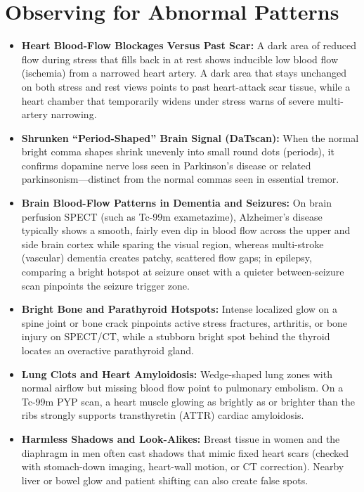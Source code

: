 \section{Observing for Abnormal Patterns}

\begin{itemize}
    \item \textbf{Heart Blood-Flow Blockages Versus Past Scar:} A dark area of reduced flow during stress that fills back in at rest shows inducible low blood flow (ischemia) from a narrowed heart artery. A dark area that stays unchanged on both stress and rest views points to past heart-attack scar tissue, while a heart chamber that temporarily widens under stress warns of severe multi-artery narrowing.
    \item \textbf{Shrunken ``Period-Shaped'' Brain Signal (DaTscan):} When the normal bright comma shapes shrink unevenly into small round dots (periods), it confirms dopamine nerve loss seen in Parkinson's disease or related parkinsonism---distinct from the normal commas seen in essential tremor.
    \item \textbf{Brain Blood-Flow Patterns in Dementia and Seizures:} On brain perfusion SPECT (such as Tc-99m exametazime), Alzheimer's disease typically shows a smooth, fairly even dip in blood flow across the upper and side brain cortex while sparing the visual region, whereas multi-stroke (vascular) dementia creates patchy, scattered flow gaps; in epilepsy, comparing a bright hotspot at seizure onset with a quieter between-seizure scan pinpoints the seizure trigger zone.
    \item \textbf{Bright Bone and Parathyroid Hotspots:} Intense localized glow on a spine joint or bone crack pinpoints active stress fractures, arthritis, or bone injury on SPECT/CT, while a stubborn bright spot behind the thyroid locates an overactive parathyroid gland.
    \item \textbf{Lung Clots and Heart Amyloidosis:} Wedge-shaped lung zones with normal airflow but missing blood flow point to pulmonary embolism. On a Tc-99m PYP scan, a heart muscle glowing as brightly as or brighter than the ribs strongly supports transthyretin (ATTR) cardiac amyloidosis.
    \item \textbf{Harmless Shadows and Look-Alikes:} Breast tissue in women and the diaphragm in men often cast shadows that mimic fixed heart scars (checked with stomach-down imaging, heart-wall motion, or CT correction). Nearby liver or bowel glow and patient shifting can also create false spots.
\end{itemize}


